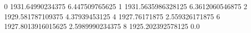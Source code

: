0 1931.64990234375 6.447509765625
1 1931.5635986328125 6.3612060546875
2 1929.581787109375 4.37939453125
4 1927.76171875 2.559326171875
6 1927.8013916015625 2.5989990234375
8 1925.202392578125 0.0
